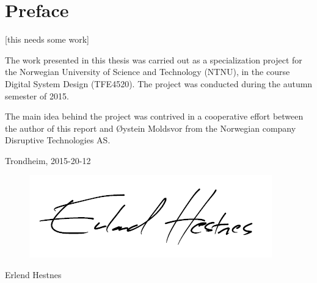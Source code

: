 \section*{Preface}
[this needs some work]

The work presented in this thesis was carried out as a specialization project for the Norwegian University of Science and Technology (NTNU), in the course Digital System Design (TFE4520). The project was conducted during the autumn semester of 2015.  

The main idea behind the project was contrived in a cooperative effort between the author of this report and Øystein Moldsvor from the Norwegian company Disruptive Technologies AS.

\begin{center}
Trondheim, 2015-20-12\\[1pc]
\begin{figure}[h]
\centering
\includegraphics[scale=0.5]{fig/underskrift.png}
\label{fig:underskrift}
\end{figure}
Erlend Hestnes
\end{center}